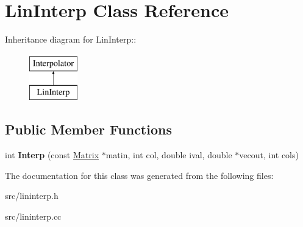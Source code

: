 \hypertarget{classLinInterp}{
\section{LinInterp Class Reference}
\label{d8/dee/classLinInterp}
}
Inheritance diagram for LinInterp::\begin{figure}[H]
\begin{center}
\leavevmode
\includegraphics[height=2cm]{d8/dee/classLinInterp}
\end{center}
\end{figure}
\subsection*{Public Member Functions}
\begin{DoxyCompactItemize}
\item 
\hypertarget{classLinInterp_a26aeb03c387bf5c8ea5db0ed111b5cd7}{
int {\bfseries Interp} (const \hyperlink{classMatrix}{Matrix} $\ast$matin, int col, double ival, double $\ast$vecout, int cols)}
\label{d8/dee/classLinInterp_a26aeb03c387bf5c8ea5db0ed111b5cd7}

\end{DoxyCompactItemize}


The documentation for this class was generated from the following files:\begin{DoxyCompactItemize}
\item 
src/lininterp.h\item 
src/lininterp.cc\end{DoxyCompactItemize}
